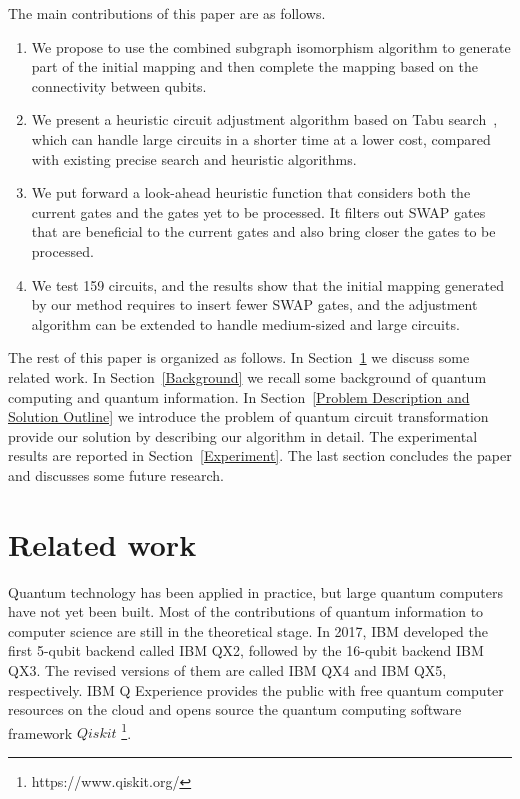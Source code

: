 \documentclass[runningheads]{llncs}
\begin{document}
The main contributions of this paper are as follows.
	\begin{enumerate}
	\item We propose to use the combined subgraph isomorphism algorithm to generate part of the initial mapping
    and then complete the mapping based on the connectivity between qubits.
	\item We present a heuristic circuit adjustment algorithm based on Tabu search~\cite{Glover1990}, which can handle large circuits in a shorter time at a lower cost, compared with existing precise search and heuristic algorithms.
	\item  We put forward a look-ahead heuristic function that considers both the current gates and the  gates yet to be processed. It filters out SWAP gates that are beneficial to the current gates and also bring closer the gates to be processed.
	\item We test 159 circuits, and the results show that the initial mapping generated by our method requires to insert fewer SWAP gates, and the adjustment algorithm can be extended to handle medium-sized and large circuits.
	\end{enumerate}

The rest of this paper is organized as follows.
In Section~\ref{Related work} we discuss some related work. 
In Section~\ref{Background} we recall some background of quantum computing and quantum information. In Section~\ref{Problem Description and Solution Outline}
we introduce the problem of  quantum circuit transformation provide our solution by describing our algorithm in detail.
The experimental results are reported in Section~\ref{Experiment}. 
The last section concludes the paper and discusses some future research.

\section{Related work}
\label{Related work}
Quantum technology has been applied in practice, but large quantum computers have not yet been built. Most of the contributions of quantum information to computer science are still in the theoretical stage. In 2017, IBM developed the first 5-qubit backend called IBM QX2, followed by the 16-qubit backend  IBM QX3. The revised versions of them are called IBM QX4 and IBM QX5, respectively. IBM Q Experience provides the public with free quantum computer resources on the cloud and opens source the quantum computing software framework $Qiskit$ \footnote{https://www.qiskit.org/}. 
\end{document}
